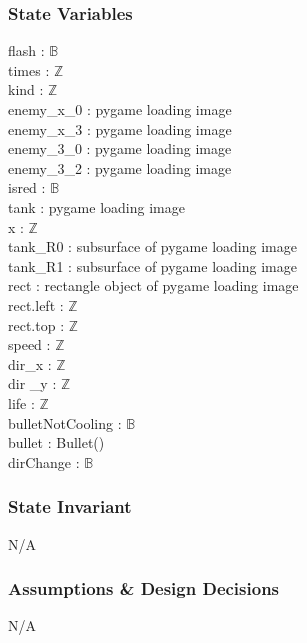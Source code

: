 \documentclass[12pt, titlepage]{article}
\begin{document}
		\subsubsection{State Variables}
		flash : $\mathbb{B}$\\
		times : $\mathbb{Z}$\\
		kind : $\mathbb{Z}$\\
		enemy\_x\_0 : pygame loading image\\
		enemy\_x\_3 : pygame loading image\\
		enemy\_3\_0 : pygame loading image\\
		enemy\_3\_2 : pygame loading image\\
		isred : $\mathbb{B}$\\
		tank : pygame loading image\\
		x : $\mathbb{Z}$\\
		tank\_R0 : subsurface of pygame loading image\\
		tank\_R1 : subsurface of pygame loading image\\
		rect : rectangle object of pygame loading image\\
		rect.left : $\mathbb{Z}$\\
		rect.top : $\mathbb{Z}$\\
		speed : $\mathbb{Z}$\\
		dir\_x : $\mathbb{Z}$\\
		dir \_y : $\mathbb{Z}$\\
		life : $\mathbb{Z}$\\
		bulletNotCooling : $\mathbb{B}$\\
		bullet : Bullet()\\
		dirChange : $\mathbb{B}$
		\subsubsection{State Invariant}
	    N/A
		
		\subsubsection{Assumptions \& Design Decisions}
		N/A
\end{document}
